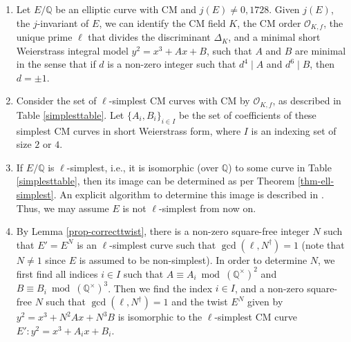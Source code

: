 \documentclass[11pt]{amsart}
\theoremstyle{definition}
\newcommand{\Q}{\mathbb{Q}}
\newcommand{\Of}{\mathcal{O}_{K,f}}
\begin{document}
\begin{enumerate}
    \item Let $E/\Q$ be an elliptic curve with CM and $j(E)\neq 0,1728$. Given $j(E)$, the $j$-invariant of $E$, we can identify the CM field $K$, the CM order $\Of$, the unique prime $\ell$ that divides the discriminant $\Delta_K$, and a minimal short Weierstrass integral model $y^2 = x^3 + Ax + B$, such that $A$ and $B$ are minimal in the sense that if $d$ is a non-zero integer such that $d^4\mid A$ and $d^6\mid B$, then $d=\pm 1$.
    \item Consider the set of $\ell$-simplest CM curves with CM by $\Of$, as described in Table \ref{simplesttable}. Let $\{ A_i, B_i \}_{i \in I }$ be the set of coefficients of these simplest CM curves in short Weierstrass form, where $I$ is an indexing set of size $2$ or $4$.
    \item  If $E/\Q$ is $\ell$-simplest, i.e., it is isomorphic (over $\Q$) to some curve in Table \ref{simplesttable}, then its image can be determined as per Theorem \ref{thm-ell-simplest}. An explicit algorithm to determine this image is described in \cite[Section 12]{elladic}. Thus, we may assume $E$ is not $\ell$-simplest from now on. 
    \item By Lemma \ref{prop-correcttwist}, there is a non-zero square-free integer $N$ such that $E'=E^N$ is an $\ell$-simplest curve such that $\gcd(\ell,N^\dagger)=1$ (note that $N\neq 1$ since $E$ is assumed to be non-simplest). In order to determine $N$, we first find all indices $i \in I$ such that $A\equiv A_i \bmod (\Q^\times)^2$ and $B\equiv B_i \bmod (\Q^\times)^3$. Then we find the index $i\in I$, and a non-zero square-free $N$ such that $\gcd(\ell,N^\dagger)=1$ and the twist $E^N$ given by $y^2 = x^3 + N^2 A x + N^3 B$ is isomorphic to the $\ell$-simplest CM curve $E': y^2 = x^3 + A_i x + B_i$.


\end{enumerate}
\end{document}
